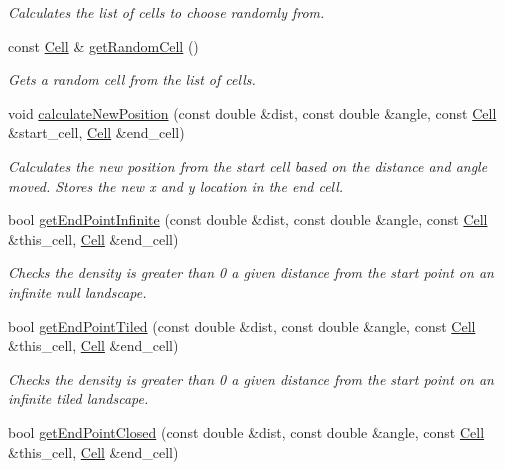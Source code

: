 \begin{DoxyCompactItemize}
\begin{DoxyCompactList}\small\item\em Calculates the list of cells to choose randomly from. \end{DoxyCompactList}\item 
const \hyperlink{struct_cell}{Cell} \& \hyperlink{class_simulate_dispersal_a7d0a2b28dd8d45f1b8a74dbcd82290e7}{get\+Random\+Cell} ()
\begin{DoxyCompactList}\small\item\em Gets a random cell from the list of cells. \end{DoxyCompactList}\item 
void \hyperlink{class_simulate_dispersal_a75eeedf1627eb25945a2d8f5dd0a2379}{calculate\+New\+Position} (const double \&dist, const double \&angle, const \hyperlink{struct_cell}{Cell} \&start\+\_\+cell, \hyperlink{struct_cell}{Cell} \&end\+\_\+cell)
\begin{DoxyCompactList}\small\item\em Calculates the new position from the start cell based on the distance and angle moved. Stores the new x and y location in the end cell. \end{DoxyCompactList}\item 
bool \hyperlink{class_simulate_dispersal_acb12b6b2f113e58c62636b2b4456f4da}{get\+End\+Point\+Infinite} (const double \&dist, const double \&angle, const \hyperlink{struct_cell}{Cell} \&this\+\_\+cell, \hyperlink{struct_cell}{Cell} \&end\+\_\+cell)
\begin{DoxyCompactList}\small\item\em Checks the density is greater than 0 a given distance from the start point on an infinite null landscape. \end{DoxyCompactList}\item 
bool \hyperlink{class_simulate_dispersal_a9694673493b261697020f42aa2fdf9e7}{get\+End\+Point\+Tiled} (const double \&dist, const double \&angle, const \hyperlink{struct_cell}{Cell} \&this\+\_\+cell, \hyperlink{struct_cell}{Cell} \&end\+\_\+cell)
\begin{DoxyCompactList}\small\item\em Checks the density is greater than 0 a given distance from the start point on an infinite tiled landscape. \end{DoxyCompactList}\item 
bool \hyperlink{class_simulate_dispersal_ab7fa3b37534cdd35871b30c7bb511351}{get\+End\+Point\+Closed} (const double \&dist, const double \&angle, const \hyperlink{struct_cell}{Cell} \&this\+\_\+cell, \hyperlink{struct_cell}{Cell} \&end\+\_\+cell)

\end{DoxyCompactItemize}

